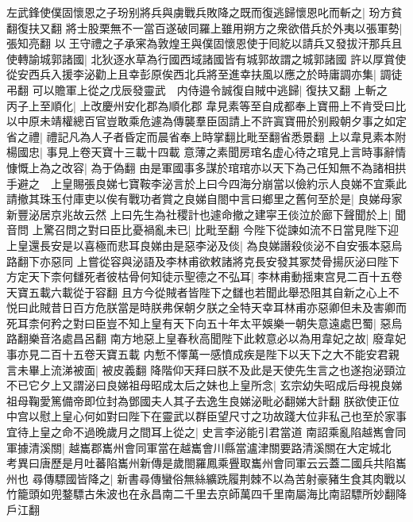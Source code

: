 左武鋒使僕固懷恩之子玢别將兵與虜戰兵敗降之既而復逃歸懷恩叱而斬之|{
	玢方貧翻復扶又翻}
將士股栗無不一當百遂破同羅上雖用朔方之衆欲借兵於外夷以張軍勢|{
	張知亮翻}
以王守禮之子承宷為敦煌王與僕固懷恩使于囘紇以請兵又發拔汗那兵且使轉諭城郭諸國|{
	北狄逐水草為行國西域諸國皆有城郭故謂之城郭諸國}
許以厚賞使從安西兵入援李泌勸上且幸彭原俟西北兵將至進幸扶風以應之於時庸調亦集|{
	調徒弔翻}
可以贍軍上從之戊辰發靈武　内侍邉令誠復自賊中逃歸|{
	復扶又翻}
上斬之　丙子上至順化|{
	上改慶州安化郡為順化郡}
韋見素等至自成都奉上寶冊上不肯受曰比以中原未靖權總百官豈敢乘危遽為傳襲羣臣固請上不許寘寶冊於别殿朝夕事之如定省之禮|{
	禮記凡為人子者昏定而晨省奉上時掌翻比毗至翻省悉景翻}
上以韋見素本附楊國忠|{
	事見上卷天寶十三載十四載}
意薄之素聞房琯名虚心待之琯見上言時事辭情慷慨上為之改容|{
	為于偽翻}
由是軍國事多謀於琯琯亦以天下為己任知無不為諸相拱手避之　上皇賜張良娣七寶鞍李泌言於上曰今四海分崩當以儉約示人良娣不宜乘此請撤其珠玉付庫吏以俟有戰功者賞之良娣自閤中言曰鄉里之舊何至於是|{
	良娣母家新豐泌居京兆故云然}
上曰先生為社稷計也遽命撤之建寜王倓泣於廊下聲聞於上|{
	聞音問}
上驚召問之對曰臣比憂禍亂未已|{
	比毗至翻}
今陛下從諫如流不日當見陛下迎上皇還長安是以喜極而悲耳良娣由是惡李泌及倓|{
	為良娣譖殺倓泌不自安張本惡烏路翻下亦惡同}
上嘗從容與泌語及李林甫欲敕諸將克長安發其冢焚骨揚灰泌曰陛下方定天下柰何讎死者彼枯骨何知徒示聖德之不弘耳|{
	李林甫動揺東宫見二百十五卷天寶五載六載從于容翻}
且方今從賊者皆陛下之讎也若聞此舉恐阻其自新之心上不悦曰此賊昔日百方危朕當是時朕弗保朝夕朕之全特天幸耳林甫亦惡卿但未及害卿而死耳柰何矜之對曰臣豈不知上皇有天下向五十年太平娛樂一朝失意遠處巴蜀|{
	惡烏路翻樂音洛處昌呂翻}
南方地惡上皇春秋高聞陛下此敕意必以為用韋妃之故|{
	廢韋妃事亦見二百十五卷天寶五載}
内慙不懌萬一感憤成疾是陛下以天下之大不能安君親言未畢上流涕被面|{
	被皮義翻}
降階仰天拜曰朕不及此是天使先生言之也遂抱泌頸泣不已它夕上又謂泌曰良娣祖母昭成太后之妹也上皇所念|{
	玄宗幼失昭成后母視良娣祖母鞠愛篤備帝即位封為鄧國夫人其子去逸生良娣泌毗必翻娣大計翻}
朕欲使正位中宫以慰上皇心何如對曰陛下在靈武以群臣望尺寸之功故踐大位非私己也至於家事宜待上皇之命不過晚歲月之間耳上從之|{
	史言李泌能引君當道}
南詔乘亂陷越嶲會同軍據清溪關|{
	越巂郡巂州會同軍當在越巂會川縣當瀘津關要路清溪關在大定城北　考異曰唐歷是月吐蕃陷巂州新傳是歲閤羅鳳乘舋取巂州會同軍云云蓋二國兵共陷巂州也}
尋傳驃國皆降之|{
	新書尋傳蠻俗無絲纊跣履荆棘不以為苦射豪豬生食其肉戰以竹籠頭如兜鍪驃古朱波也在永昌南二千里去京師萬四千里南屬海比南詔驃所妙翻降戶江翻}


